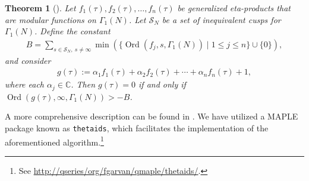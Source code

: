\documentclass[10pt,a4paper]{amsart}
\numberwithin{equation}{section}
\newtheorem{Theorem}{Theorem}[section]
\theoremstyle{definition}
\begin{document}
\begin{Theorem}[{\cite[Corollary 2.5]{FrGa19}}]\label{Thm-2.4}
Let $f_1(\tau), f_2(\tau), \dots, f_n(\tau)$ be generalized eta-products that are modular functions on $\Gamma_1(N)$. Let $\mathcal{S}_N$ be a set of inequivalent cusps for~$\Gamma_1(N)$. Define the constant
\begin{align}\label{B}
B=\sum_{s\in\mathcal{S}_N,~s\neq\infty}\min(\{\operatorname{Ord}(f_j,s,\Gamma_1(N)) \mid 1 \leq j\leq n\}\cup\{0\}),
\end{align}
and consider
\begin{align*}
g(\tau):=\alpha_1f_1(\tau)+\alpha_2f_2(\tau)+\cdots+\alpha_nf_n(\tau)+1,
\end{align*}
where each $\alpha_j\in\mathbb{C}$. Then
$g(\tau)=0$
if and only if
$\operatorname{Ord}(g(\tau),\infty,\Gamma_1(N)) > -B$.
\end{Theorem}
A more comprehensive description can be found in \cite{FrGa19}. We have utilized a MAPLE package known as \texttt{thetaids}, which facilitates the implementation of the aforementioned algorithm.\footnote{See
\url{http://qseries/org/fgarvan/qmaple/thetaids/}.}
\end{document}

